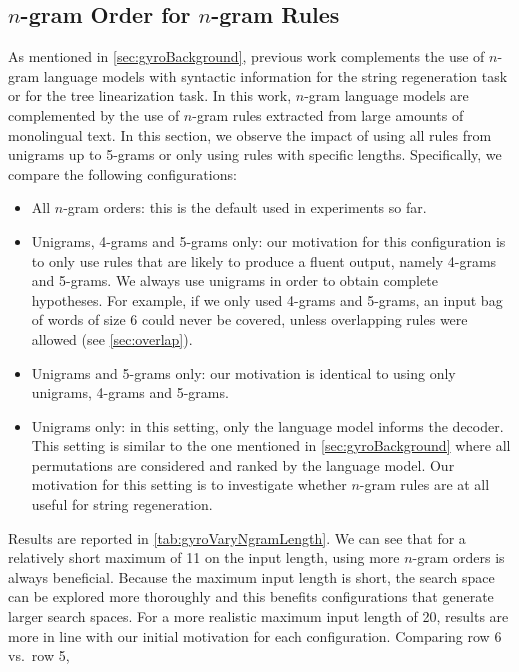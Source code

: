 
\subsection{$n$-gram Order for $n$-gram Rules}
\label{sec:gyroEffectNgramOrder}

As mentioned in \autoref{sec:gyroBackground}, previous
work complements the use of $n$-gram language models with
syntactic information for the string regeneration task or for the tree
linearization task. In this work, $n$-gram language models are complemented
by the use of $n$-gram rules extracted from large amounts of monolingual text.
In this section, we observe the impact of using all rules from unigrams
up to 5-grams or only using rules with specific lengths.
Specifically, we compare the following configurations:
%
\begin{itemize}
  \item All $n$-gram orders: this is the default used in experiments so far.
  \item Unigrams, 4-grams and 5-grams only: our motivation for this configuration
    is to only use rules that are likely to produce a fluent output, namely 4-grams
    and 5-grams. We always use unigrams in order to obtain complete hypotheses.
    For example, if we only used 4-grams and 5-grams, an
    input bag of words of size 6 could
    never be covered, unless overlapping rules were allowed (see \autoref{sec:overlap}).
  \item Unigrams and 5-grams only: our motivation is identical to using
    only unigrams, 4-grams and 5-grams.
  \item Unigrams only: in this setting, only the language model
    informs the decoder. This setting is similar to the one mentioned
    in \autoref{sec:gyroBackground} where all permutations are considered
    and ranked by the language model. Our motivation for this setting is to
    investigate whether $n$-gram rules are at all useful for string regeneration.
\end{itemize}
%
Results
are reported in \autoref{tab:gyroVaryNgramLength}.
We can see that for a relatively short maximum of 11 on the input length,
using more $n$-gram orders is always beneficial.
Because the maximum input length is short, the search space can be
explored more thoroughly and this benefits configurations that generate
larger search spaces.
For a more realistic maximum input length of 20, results are more in line
with our initial motivation for each configuration. Comparing row 6 vs.\ row 5,
